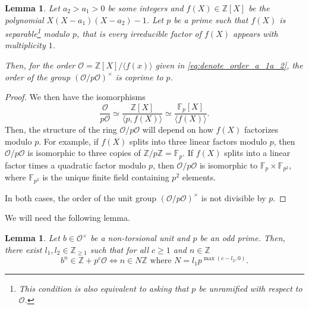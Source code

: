 \documentclass[11pt,letterpaper]{amsart}
\newtheorem{lem}[theorem]{Lemma}
\theoremstyle{definition}
\theoremstyle{remark}
\newcommand{\cal}[1]{\mathcal{#1}}
\newcommand{\bb}[1]{\mathbb{#1}}
\newcommand{\Z}{\bb Z}
\newcommand{\calO}{\cal O}
\begin{document}
	\begin{lem}
		\label{le:multiplicate_mod_p}
		Let $a_2 > a_1 > 0$ be some integers and $f(X) \in \mathbb{Z}[X]$ be the polynomial $X(X-a_1)(X-a_2)-1$. 
		Let $p$ be a prime such that $f(X)$ is separable\footnote{
			This condition is also equivalent to asking that $p$ be unramified with respect to $\calO$.
		} modulo $p$, that is every irreducible factor of $f(X)$ appears with multiplicity $1$.
		
		Then, for the order $\mathcal{O}= \mathbb{Z}[X]/\langle f(x) \rangle$ given in \cref{eq:denote_order_a_1a_2},
		the order of the group $(\mathcal{O}/p\mathcal{O})^{\times}$ is coprime to $p$.
	\end{lem}
	\begin{proof}
		We then have the isomorphisms
		\begin{equation}
			\frac{\mathcal{O}}{p\mathcal{O}} \simeq \frac{\mathbb{Z}[X]}{\langle p, f(X) \rangle } \simeq \frac{\mathbb{F}_p[X]}{ \langle f(X) \rangle}.
		\end{equation}
		Then, the structure of the ring $\calO/p\mathcal{O}$ will depend on how $f(X)$ factorizes modulo $p$. For example, if $f(X)$ splits into three linear factors modulo $p$, then $\calO/p\calO$ is isomorphic to three copies of $\mathbb{Z}/p\mathbb{Z} = \mathbb{F}_{p}$. 
		If $f(X)$ splits into a linear factor times a quadratic factor modulo $p$, then $\calO/p\calO$ is isomorphic to $\mathbb{F}_{p} \times \mathbb{F}_{p^{2}}$, where $\mathbb{F}_{p^{2}}$ is the unique finite field containing $p^{2}$ elements.
		
		In both cases, the order of the unit group $(\calO/p\calO)^{\times}$ is not divisible by $p$.
	\end{proof}
	\fi
	We will need the following lemma.
	\begin{lem}
		\label{le:order_mod_prime_power}
		Let $b \in \calO^{\times}$ be a non-torsional unit
		and $p$ be an odd prime.
		Then, there exist $l_1, l_2 \in \Z_{\geq 1}$ such that for all $c \geq 1$ and $n\in\Z$
		\begin{equation}
			b^{n} \in \Z + p^{c}\calO \Leftrightarrow n \in N\Z \text{ where }N =  l_1p^{\max ( c-l_2, 0)}. 
		\end{equation}

	\end{lem}
\end{document}
